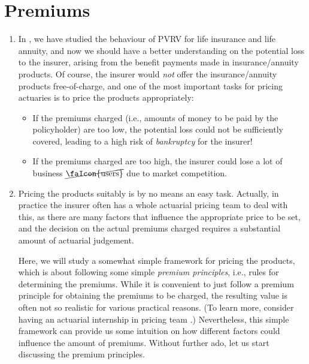 \section{Premiums}
\label{sect:premiums}
\begin{enumerate}
\item In , we have studied the
behaviour of PVRV for life insurance and life annuity, and now we should have a
better understanding on the potential loss to the insurer, arising from the
benefit payments made in insurance/annuity products. Of course, the insurer
would \emph{not} offer the insurance/annuity products free-of-charge, and one
of the most important tasks for pricing actuaries is to price the products
appropriately:
\begin{itemize}
\item If the premiums charged (i.e., amounts of money to be paid by the
policyholder) are too low, the potential loss could not be sufficiently
covered, leading to a high risk of \emph{bankruptcy} for the insurer!  \item If
the premiums charged are too high, the insurer could lose a lot of business
\(\cancel{\text{\faIcon{users}}}\) due to market competition.
\end{itemize}
\item Pricing the products suitably is by no means an easy task. Actually, in
practice the insurer often has a whole actuarial pricing team to deal with
this, as there are many factors that influence the appropriate price to be set,
and the decision on the actual premiums charged requires a substantial amount of
actuarial judgement.

Here, we will study a somewhat simple framework for pricing the products, which
is about following some simple \emph{premium principles}, i.e., rules for
determining the premiums. While it is convenient to just follow a premium
principle for obtaining the premiums to be charged, the resulting value is
often not so realistic for various practical reasons. (To learn more, consider
having an actuarial internship in pricing team .)
Nevertheless, this simple framework can provide us some intuition on how
different factors could influence the amount of premiums. Without further ado,
let us start discussing the premium principles.
\end{enumerate}

